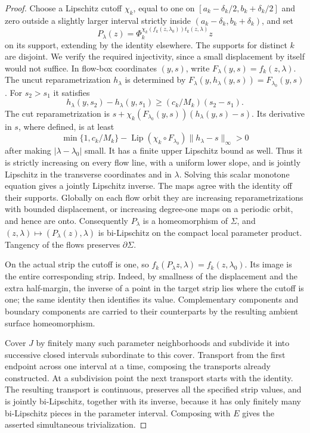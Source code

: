 \documentclass[11pt]{article}
\numberwithin{equation}{section}
\theoremstyle{definition}
\theoremstyle{remark}
\begin{document}
\begin{proof}
Choose a Lipschitz cutoff $\chi_k$, equal to one on
$[a_k-\delta_k/2,b_k+\delta_k/2]$ and zero outside a slightly
larger interval strictly inside
$(a_k-\delta_k,b_k+\delta_k)$, and set
\[
 P_\lambda(z)=
 \Phi_k^{\chi_k(f_k(z,\lambda_0))t_k(z,\lambda)}z
\]
on its support, extending by the identity elsewhere.  The supports
for distinct $k$ are disjoint.  We verify the required injectivity,
since a small displacement by itself would not suffice.  In flow-box
coordinates $(y,s)$, write $F_\lambda(y,s)=f_k(z,\lambda)$.
The uncut reparametrization $h_\lambda$ is determined by
$F_\lambda(y,h_\lambda(y,s))=F_{\lambda_0}(y,s)$.
For $s_2>s_1$ it satisfies
\[
 h_\lambda(y,s_2)-h_\lambda(y,s_1)
       \geq (c_k/M_k)(s_2-s_1).
\]
The cut reparametrization is
$s+\chi_k(F_{\lambda_0}(y,s))(h_\lambda(y,s)-s)$.
Its derivative in $s$, where defined, is at least
\[
 \min\{1,c_k/M_k\}
 -\operatorname{Lip}(\chi_k\circ F_{\lambda_0})
                      \|h_\lambda-s\|_\infty>0
\]
after making $|\lambda-\lambda_0|$ small.  It has a finite upper
Lipschitz bound as well.  Thus it is strictly increasing on every
flow line, with a uniform lower slope, and is jointly Lipschitz in
the transverse coordinates and in $\lambda$.  Solving this scalar
monotone equation gives a jointly Lipschitz inverse.  The maps agree
with the identity off their supports.  Globally on each flow orbit
they are increasing reparametrizations with bounded displacement,
or increasing degree-one maps on a periodic orbit, and hence are
onto.  Consequently $P_\lambda$ is a homeomorphism of $\Sigma$,
and $(z,\lambda)\mapsto(P_\lambda(z),\lambda)$ is bi-Lipschitz
on the compact local parameter product.  Tangency of the flows
preserves $\partial\Sigma$.

On the actual strip the cutoff is one, so
$f_k(P_\lambda z,\lambda)=f_k(z,\lambda_0)$.
Its image is the entire corresponding strip.  Indeed, by smallness
of the displacement and the extra half-margin, the inverse of a
point in the target strip lies where the cutoff is one; the same
identity then identifies its value.  Complementary components and
boundary components are carried to their counterparts by the
resulting ambient surface homeomorphism.

Cover $J$ by finitely many such parameter neighborhoods and
subdivide it into successive closed intervals subordinate to this
cover.  Transport from the first endpoint across one interval at a
time, composing the transports already constructed.  At a subdivision
point the next transport starts with the identity.  The resulting
transport is continuous, preserves all the specified strip values,
and is jointly bi-Lipschitz, together with its inverse, because it
has only finitely many bi-Lipschitz pieces in the parameter interval.
Composing with $E$ gives the asserted simultaneous trivialization.


\end{proof}
\end{document}
